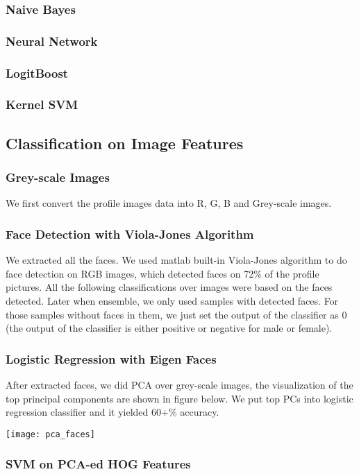 \subsubsection{Naive Bayes}
\subsubsection{Neural Network}
\subsubsection{LogitBoost}
\subsubsection{Kernel SVM}
\subsection{Classification on Image Features}
\subsubsection{Grey-scale Images}
We first convert the profile images data into R, G, B and Grey-scale images. 
\subsubsection{Face Detection with Viola-Jones Algorithm}
We extracted all the faces. We used matlab built-in Viola-Jones algorithm to do face detection on RGB images, which detected faces on 72\% of the profile pictures. All the following classifications over images were based on the faces detected. Later when ensemble, we only used samples with detected faces. For those samples without faces in them, we just set the output of the classifier as 0 (the output of the classifier is either positive or negative for male or female).
\subsubsection{Logistic Regression with Eigen Faces}
After extracted faces, we did PCA over grey-scale images, the visualization of the top principal components are shown in figure below. We put top PCs into logistic regression classifier and it yielded 60+\% accuracy. \\
\begin{center}
\texttt{[image: pca\_faces]}
\end{center}
\subsubsection{SVM on PCA-ed HOG Features}

